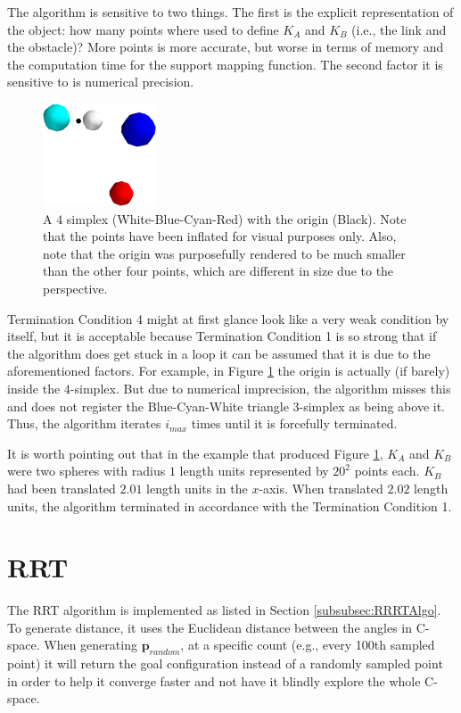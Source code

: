 The algorithm is sensitive to two things. The first is the explicit representation of the object: how many points where used to define $K_A$ and $K_B$ (i.e., the link and the obstacle)? More points is more accurate, but worse in terms of memory and the computation time for the support mapping function. The second factor it is sensitive to is numerical precision.

\begin{figure}[h]
	\centering
	\includegraphics[width=0.3\textwidth]{import/GJK_CBA_triangle}
	\caption{A $4$ simplex (White-Blue-Cyan-Red) with the origin (Black). Note that the points have been inflated for visual purposes only. Also, note that the origin was purposefully rendered to be much smaller than the other four points, which are different in size due to the perspective.}
	\label{fig:GJK_CBA}
\end{figure}

Termination Condition 4 might at first glance look like a very weak condition by itself, but it is acceptable because Termination Condition 1 is so strong that if the algorithm does get stuck in a loop it can be assumed that it is due to the aforementioned factors. For example, in Figure \ref{fig:GJK_CBA} the origin is actually (if barely) inside the $4$-simplex. But due to numerical imprecision, the algorithm misses this and does not register the Blue-Cyan-White triangle $3$-simplex as being above it. Thus, the algorithm iterates $i_{max}$ times until it is forcefully terminated.

It is worth pointing out that in the example that produced Figure \ref{fig:GJK_CBA}, $K_A$ and $K_B$ were two spheres with radius $1$ length units represented by $20^2$ points each. $K_B$ had been translated $2.01$ length units in the $x$-axis. When translated $2.02$ length units, the algorithm terminated in accordance with the Termination Condition 1.


\section{RRT}

The \gls{RRT} algorithm is implemented as listed in Section \ref{subsubsec:RRRTAlgo}. To generate distance, it uses the Euclidean distance between the angles in C-space. When generating $\textbf{p}_{random}$, at a specific count (e.g., every 100th sampled point) it will return the goal configuration instead of a randomly sampled point in order to help it converge faster and not have it blindly explore the whole C-space.

